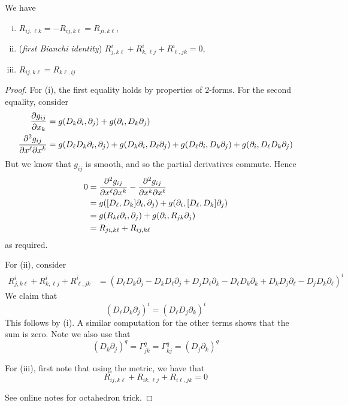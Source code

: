 \documentclass{article}
\begin{document}
\begin{proposition}
     We have
    \begin{enumerate}[(i)]
        \item \(R_{ij, \ell k} = -R_{ij, k\ell} = R_{ji, k\ell}\),
        \item (\emph{first Bianchi identity}) \(R^i_{j,k\ell} + R^i_{k, \ell j} + R^i_{\ell, jk} = 0\),
        \item \(R_{ij, k\ell} = R_{k\ell, ij}\)
    \end{enumerate}
\end{proposition}

\begin{proof}
    For (i), the first equality holds by properties of \(2\)-forms. For the second equality, consider
    \begin{align*}
        \pdv{g_{ij}}{x_k} &= g(D_k\partial_i, \partial_j) + g(\partial_i, D_k\partial_j) \\
        \pdv[2]{g_{ij}}{x^\ell}{x^k} &= g(D_\ell D_k\partial_i, \partial_j) + g(D_k\partial_i, D_\ell\partial_j) + g(D_\ell\partial_i, D_k\partial_j) + g(\partial_i, D_\ell D_k\partial_j)
    \end{align*}
    But we know that \(g_{ij}\) is smooth, and so the partial derivatives commute. Hence
    \begin{align*}
        0 &= \pdv[2]{g_{ij}}{x^\ell}{x^k} - \pdv[2]{g_{ij}}{x^k}{x^\ell} \\
        &= g([D_\ell, D_k]\partial_i, \partial_j) + g(\partial_i, [D_\ell, D_k]\partial_j) \\
        &= g(R_{k\ell}\partial_i, \partial_j) + g(\partial_i, R_{jk}\partial_j) \\
        &= R_{ji, k\ell} + R_{ij, k\ell}
    \end{align*}
    as required.

    For (ii), consider
    \begin{align*}
        R^i_{j,k\ell} + R^i_{k, \ell j} + R^i_{\ell, jk} &= \left(D_\ell D_k\partial_j - D_kD_\ell \partial_j + D_jD_\ell \partial_k - D_\ell D_k\partial_k + D_kD_j\partial_\ell - D_jD_k\partial_\ell\right)^i
    \end{align*}
    We claim that
    \[(D_\ell D_k\partial_j)^i = (D_\ell D_j\partial_k)^i\]
    This follows by (i). A similar computation for the other terms shows that the sum is zero. Note we also use that
    \[(D_k\partial_j)^q = \Gamma^q_{jk} = \Gamma^q_{kj} = (D_j\partial_k)^q\]

    For (iii), first note that using the metric, we have that
    \[R_{ij, k\ell} + R_{ik, \ell j} + R_{i\ell, jk} = 0\]

    See online notes for octahedron trick.
\end{proof}
\end{document}
